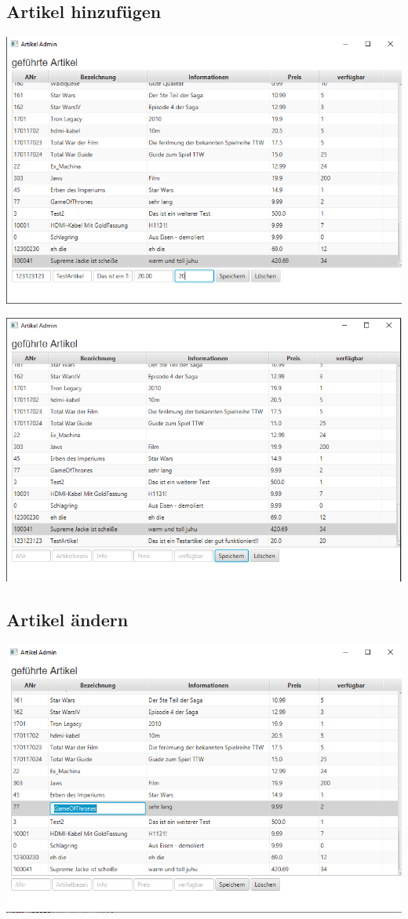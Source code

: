 \subsection{Artikel hinzufügen}

\begin{minipage}{\linewidth}
	\centering
	\includegraphics[width=0.8\linewidth]{images/hinzufuegen1}
\end{minipage}

\begin{minipage}{\linewidth}
	\centering
	\includegraphics[width=0.8\linewidth]{images/hinzufuegen2}
\end{minipage}

\subsection{Artikel ändern}

\begin{minipage}{\linewidth}
	\centering
	\includegraphics[width=0.8\linewidth]{images/aendern1}
\end{minipage}

